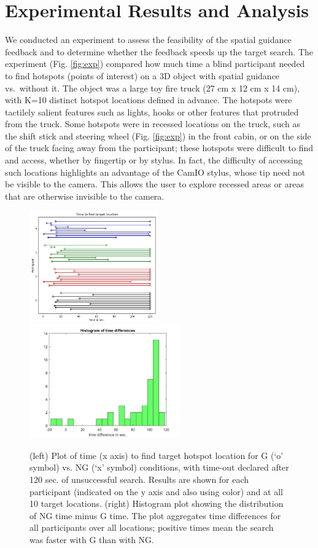 \documentclass[runningheads]{res/templates/llncs}
\begin{document}
\hypertarget{results}{%
\section{Experimental Results and Analysis}\label{results}}

We conducted an experiment to assess the feasibility of the spatial
guidance feedback and to determine whether the feedback speeds up the
target search. The experiment (Fig. \ref{fig:exp}) compared how much time a
blind participant needed to find hotspots (points of interest) on a 3D
object with spatial guidance vs.~without it. The object was a large toy
fire truck (27 cm x 12 cm x 14 cm), with K=10 distinct hotspot locations
defined in advance. The hotspots were tactilely salient features such as
lights, hooks or other features that protruded from the truck. Some
hotspots were in recessed locations on the truck, such as the shift
stick and steering wheel (Fig. \ref{fig:exp}) in the front cabin, or on the
side of the truck facing away from the participant; these hotspots were
difficult to find and access, whether by fingertip or by stylus. In
fact, the difficulty of accessing such locations highlights an advantage
of the CamIO stylus, whose tip need not be visible to the camera. This
allows the user to explore recessed areas or areas that are otherwise
invisible to the camera.

\begin{figure}
\includegraphics[width=5.5cm, keepaspectratio,]{res/img/fig2a.jpg}
\includegraphics[width=6.5cm, keepaspectratio,]{res/img/fig2b.jpg}
\caption{(left) Plot of time (x axis) to find target hotspot location for G (‘o’ symbol) vs. NG  (‘x’ symbol) conditions, with time-out declared after 120 sec. of unsuccessful search. Results are shown for each participant (indicated on the y axis and also using color) and at all 10 target locations. (right) Histogram plot showing the distribution of NG time minus G time. The plot aggregates time differences for all participants over all locations; positive times mean the search was faster with G than with NG.}
\label{fig:res}
\end{figure}
\end{document}
